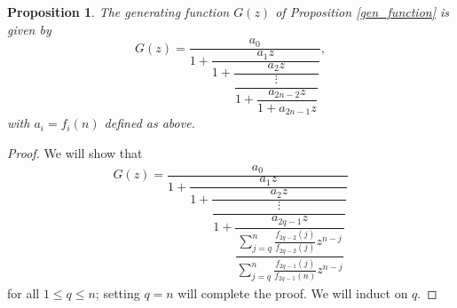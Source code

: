 \documentclass{amsart}
\theoremstyle{plain}
\newtheorem{prop}[equation]{Proposition}
\theoremstyle{remark}
\begin{document}
\begin{prop} \label{cont_frac_prop}
The generating function $G(z)$ of Proposition \ref{gen_function} is given by  \[G(z)=\dfrac{a_0}{1+\dfrac{a_1z}{1+\dfrac{a_2z}{\dfrac{\vdots}{1+\dfrac{a_{2n-2}z}{1+a_{2n-1}z}}}}},\]
with $a_i=f_i(n)$ defined as above.
\end{prop}

\begin{proof}
We will show that 
\begin{align*}
G(z)=\dfrac{a_0}{1+\dfrac{a_1z}{1+\dfrac{a_2z}{\dfrac{\vdots}{1+\dfrac{a_{2q-1}z}{\dfrac{\sum_{j=q}^n\frac{f_{2q-2}(j)}{f_{2q-2}(j)}z^{n-j}}{\sum_{j=q}^n\frac{f_{2q-1}(j)}{f_{2q-1}(n)}z^{n-j}}}}}}}
\end{align*}
for all $1\le q\le n$; setting $q=n$ will complete the proof. We will induct on $q$. 




\end{proof}
\end{document}

